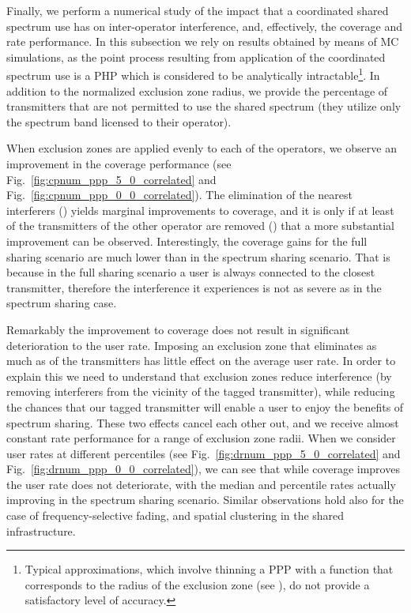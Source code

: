 \documentclass[12pt, journal,doublecolumn, final]{IEEEtran}
\newcommand{\Fig}[1]{Fig.~\ref{fig:#1}}
\begin{document}
Finally, we perform a numerical study of the impact that a coordinated shared spectrum use has on inter-operator interference, and, effectively, the coverage and rate performance. In this subsection we rely on results obtained by means of \ac{MC} simulations, as the point process resulting from application of the coordinated spectrum use is a \ac{PHP} \cite{Haenggi_2013} which is considered to be analytically intractable\footnote{Typical approximations, which involve thinning a \ac{PPP} with a function that corresponds to the radius of the exclusion zone (see \cite{YazdanshenasanDhillonAfshangChong_2016}), do not provide a satisfactory level of accuracy.}. In addition to the normalized exclusion zone radius, we provide the percentage of transmitters that are not permitted to use the shared spectrum (they utilize only the spectrum band licensed to their operator). 

When exclusion zones are applied evenly to each of the operators, we observe an improvement in the coverage performance (see \Fig{cpnum_ppp_5_0_correlated} and \Fig{cpnum_ppp_0_0_correlated}). The elimination of the nearest interferers () yields marginal improvements to coverage, and it is only if at least  of the transmitters of the other operator are removed () that a more substantial improvement can be observed. Interestingly, the coverage gains for the full sharing scenario are much lower than in the spectrum sharing scenario. That is because in the full sharing scenario a user is always connected to the closest transmitter, therefore the interference it experiences is not as severe as in the spectrum sharing case. 

Remarkably the improvement to coverage does not result in significant deterioration to the user rate. Imposing an exclusion zone that eliminates as much as  of the transmitters has little effect on the average user rate. In order to explain this we need to understand that exclusion zones reduce interference (by removing interferers from the vicinity of the tagged transmitter), while reducing the chances that our tagged transmitter will enable a user to enjoy the benefits of spectrum sharing. These two effects cancel each other out, and we receive almost constant rate performance for a range of exclusion zone radii.
When we consider user rates at different percentiles (see \Fig{drnum_ppp_5_0_correlated} and \Fig{drnum_ppp_0_0_correlated}), we can see that while coverage improves the user rate does not deteriorate, with the median and  percentile rates actually improving in the spectrum sharing scenario. Similar observations hold also for the case of frequency-selective fading, and spatial clustering in the shared infrastructure.
\end{document}
